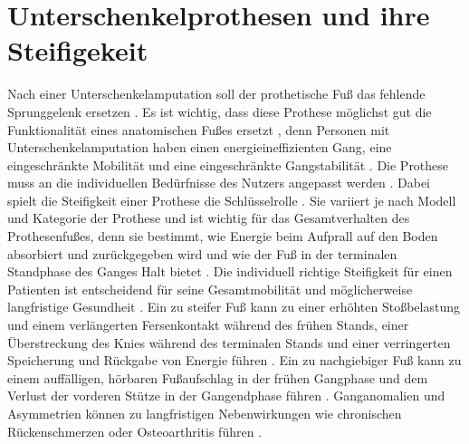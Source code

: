 \section{Unterschenkelprothesen und ihre Steifigekeit}
Nach einer Unterschenkelamputation soll der prothetische Fuß das fehlende Sprunggelenk ersetzen \cite{Louessard.2022}. Es ist wichtig, dass diese Prothese möglichst gut die Funktionalität eines anatomischen Fußes ersetzt \cite{Stevens.2018}, denn Personen mit Unterschenkelamputation haben einen energieineffizienten Gang, eine eingeschränkte Mobilität und eine eingeschränkte Gangstabilität \cite{Major.2014}\cite{Vaca.2022}.
Die Prothese muss an die individuellen Bedürfnisse des Nutzers angepasst werden \cite{Stevens.2018}. Dabei spielt die Steifigkeit einer Prothese die Schlüsselrolle \cite{Shepherd.2020}.
Sie variiert je nach Modell und Kategorie der Prothese und ist wichtig für das Gesamtverhalten des Prothesenfußes, denn sie bestimmt, wie Energie beim Aufprall auf den Boden absorbiert und zurückgegeben wird und wie der Fuß in der terminalen Standphase des Ganges Halt bietet \cite{Shepherd.2020}. Die individuell richtige Steifigkeit für einen Patienten ist entscheidend für seine Gesamtmobilität und möglicherweise langfristige Gesundheit \cite{Shepherd.2020}.
Ein zu steifer Fuß kann zu einer erhöhten Stoßbelastung und einem verlängerten Fersenkontakt während des frühen Stands, einer Überstreckung des Knies während des terminalen Stands und einer verringerten Speicherung und Rückgabe von Energie führen \cite{Shepherd.2020}. Ein zu nachgiebiger Fuß kann zu einem auffälligen, hörbaren Fußaufschlag in der frühen Gangphase und dem Verlust der vorderen Stütze in der Gangendphase führen \cite{Shepherd.2020}.
Ganganomalien und Asymmetrien können zu langfristigen Nebenwirkungen wie chronischen Rückenschmerzen oder Osteoarthritis führen \cite{Shepherd.2020}.


